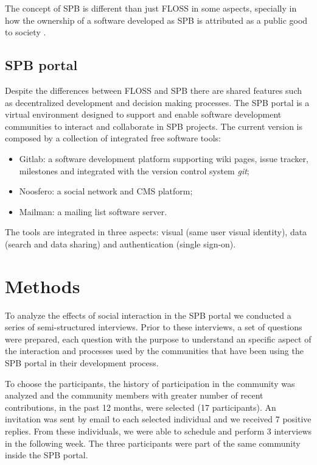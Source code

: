 \documentclass{sigchi}
\begin{document}
The concept of SPB is different than just FLOSS in some aspects, specially in how the ownership of a software developed as SPB is attributed as a public good to society \cite{Meirelles2015}.

\subsection{SPB portal}

Despite the differences between FLOSS and SPB there are shared features such as decentralized development and decision making processes. The SPB portal is a virtual environment designed to support and enable software development communities to interact and collaborate in SPB projects\cite{Meirelles2015}. The current version is composed by a collection of integrated free software tools:

\begin{itemize}
  \item Gitlab: a software development platform supporting wiki pages, issue tracker, milestones and integrated with the version control system \textit{git};
  \item Noosfero: a social network and CMS platform;
  \item Mailman: a mailing list software server.
\end{itemize}

The tools are integrated in three aspects: visual (same user visual identity), data (search and data sharing) and authentication (single sign-on).

\section{Methods}

To analyze the effects of social interaction in the SPB portal we conducted a series of semi-structured interviews. Prior to these interviews, a set of questions were prepared, each question with the purpose to understand an specific aspect of the interaction and processes used by the communities that have been using the SPB portal in their development process. 

To choose the participants, the history of participation in the community was analyzed and the community members with greater number of recent contributions, in the past 12 months, were selected (17 participants). An invitation was sent by email to each selected individual and we received 7 positive replies. From these individuals, we were able to schedule and perform 3 interviews in the following week. The three participants were part of the same community inside the SPB portal.
\end{document}

